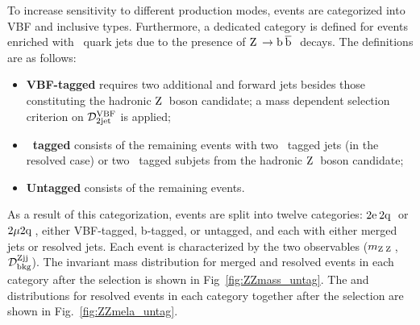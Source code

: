 To increase sensitivity to different production modes, events are categorized into VBF and inclusive types.
Furthermore, a dedicated category is defined for events enriched with \cPqb\ quark jets due to the presence of $\cPZ\to\bbbar$ decays. The definitions are as follows:
\begin{itemize}
	\item  \textbf{VBF-tagged} requires two additional and forward jets besides those constituting the hadronic $\mathrm{Z}\hspace{0.2em}$ boson candidate; a mass dependent selection criterion on ${\cal D}^\mathrm{VBF}_{\mathrm{2jet}}$ is applied;
	\item  \textbf{\cPqb\ tagged} consists of the remaining events with two \cPqb\ tagged jets (in the resolved case) or two \cPqb\ tagged subjets from the hadronic $\mathrm{Z}\hspace{0.2em}$ boson candidate;
	\item  \textbf{Untagged} consists of the remaining events.
\end{itemize}

As a result of this categorization, events are split into twelve categories: $2\mathrm{e}\hspace{0.2em} 2\mathrm{q}\hspace{0.2em}$ or $2\mu 2\mathrm{q}\hspace{0.2em}$, either VBF-tagged, b-tagged, or untagged, and each with either merged jets or resolved jets.
Each event is characterized by the two observables ($m_{\mathrm{Z}\hspace{0.2em}\mathrm{Z}\hspace{0.2em}}$, $\mathcal{D}_\textrm{bkg}^\textrm{Zjj}$). The invariant mass distribution for merged and resolved events in each category after the selection is shown in Fig~\ref{fig:ZZmass_untag}. The \ZJJMELA and \VBFMELA distributions for resolved events in each category together after the selection are shown in Fig.~\ref{fig:ZZmela_untag}.

